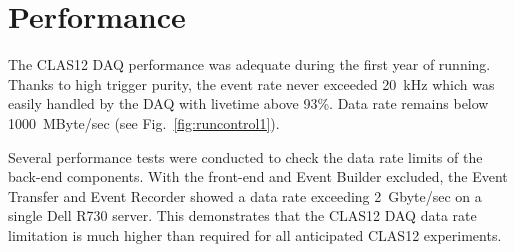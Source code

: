 \section{Performance}

The CLAS12 DAQ performance was adequate during the first year of running. Thanks to high trigger purity, the event rate never exceeded 20~kHz which was easily handled by the DAQ with livetime above 93\%. Data rate remains below 1000~MByte/sec (see Fig.~\ref{fig:runcontrol1}).

Several performance tests were conducted to check the data rate limits of the back-end components. With the front-end and Event Builder excluded, the Event Transfer and Event Recorder showed a data rate exceeding 2~Gbyte/sec on a single Dell R730 server. This demonstrates that the CLAS12 DAQ data rate limitation is much higher than required for all anticipated CLAS12 experiments.

